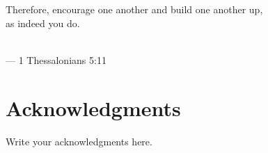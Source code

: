 
\begin{flushright}{\slshape

    Therefore, encourage one another and build one another up,\\as indeed you do.}
  \\ \medskip --- {1 Thessalonians 5:11}
\end{flushright}

\bigskip

\begingroup
\let\clearpage\relax
\let\cleardoublepage\relax
\let\cleardoublepage\relax
\chapter*{Acknowledgments}
Write your acknowledgments here.
\small

\endgroup